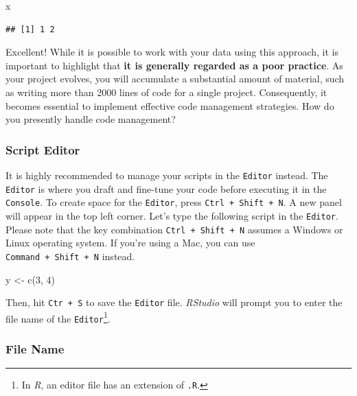 \documentclass[
]{article}
\newenvironment{Shaded}{\begin{snugshade}}{\end{snugshade}}
\newcommand{\DecValTok}[1]{\textcolor[rgb]{0.00,0.00,0.81}{#1}}
\newcommand{\FunctionTok}[1]{\textcolor[rgb]{0.00,0.00,0.00}{#1}}
\newcommand{\NormalTok}[1]{#1}
\newcommand{\OtherTok}[1]{\textcolor[rgb]{0.56,0.35,0.01}{#1}}
\begin{document}
\begin{Shaded}
\begin{Highlighting}[]
\NormalTok{x}
\end{Highlighting}
\end{Shaded}

\begin{verbatim}
## [1] 1 2
\end{verbatim}

Excellent! While it is possible to work with your data using this approach, it is important to highlight that \textbf{it is generally regarded as a poor practice}. As your project evolves, you will accumulate a substantial amount of material, such as writing more than 2000 lines of code for a single project. Consequently, it becomes essential to implement effective code management strategies. How do you presently handle code management?

\hypertarget{script-editor}{%
\subsubsection{Script Editor}\label{script-editor}}

It is highly recommended to manage your scripts in the \texttt{Editor} instead. The \texttt{Editor} is where you draft and fine-tune your code before executing it in the \texttt{Console}. To create space for the \texttt{Editor}, press \texttt{Ctrl\ +\ Shift\ +\ N}. A new panel will appear in the top left corner. Let's type the following script in the \texttt{Editor}. Please note that the key combination \texttt{Ctrl\ +\ Shift\ +\ N} assumes a Windows or Linux operating system. If you're using a Mac, you can use \texttt{Command\ +\ Shift\ +\ N} instead.

\begin{Shaded}
\begin{Highlighting}[]
\NormalTok{y }\OtherTok{\textless{}{-}} \FunctionTok{c}\NormalTok{(}\DecValTok{3}\NormalTok{, }\DecValTok{4}\NormalTok{)}
\end{Highlighting}
\end{Shaded}

Then, hit \texttt{Ctr\ +\ S} to save the \texttt{Editor} file. \emph{RStudio} will prompt you to enter the file name of the \texttt{Editor}\footnote{In \emph{R}, an editor file has an extension of \texttt{.R}.}.

\hypertarget{file-name}{%
\subsubsection{File Name}\label{file-name}}
\end{document}
